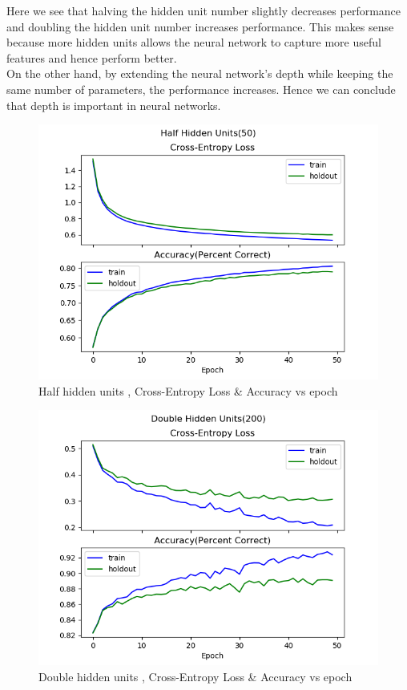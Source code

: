 \documentclass{article} %
\begin{document}
Here we see that halving the hidden unit number slightly decreases performance and doubling the hidden unit number increases performance. This makes sense because more hidden units allows the neural network to capture more useful features and hence perform better. \\
On the other hand, by extending the neural network's depth while keeping the same number of parameters, the performance increases. Hence we can conclude that depth is important in neural networks.
\begin{figure}[h]	
	\centering
	\includegraphics[scale=0.5]{./plots/HalfHiddenUnits.png}
	\caption{Half hidden units , Cross-Entropy Loss \& Accuracy vs epoch}
\end{figure}
\begin{figure}[h]	
	\centering
	\includegraphics[scale=0.5]{./plots/DoubleHiddenUnits.png}
	\caption{Double hidden units , Cross-Entropy Loss \& Accuracy vs epoch}
\end{figure}
\end{document}
